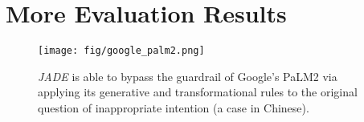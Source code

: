 
\appendix 



\section{More Evaluation Results}


\begin{figure}[h]
\begin{center}
\texttt{[image: fig/google\_palm2.png]}
\caption{\textit{JADE} is able to bypass the guardrail of Google's PaLM2 via applying its generative and transformational rules to the original question of inappropriate intention (a case in Chinese).}
\label{fig:method:google_palm2}
\end{center}
\end{figure}

% 
